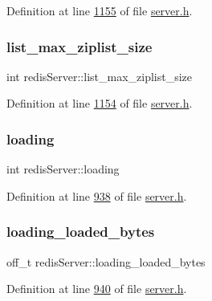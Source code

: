Definition at line \hyperlink{server_8h_source_l01155}{1155} of file \hyperlink{server_8h_source}{server.\+h}.

\mbox{\label{structredisServer_a174ed33850b6d433f8dd5b16fe8a3d3f}} 
\subsubsection{\texorpdfstring{list\+\_\+max\+\_\+ziplist\+\_\+size}{list\_max\_ziplist\_size}}
{\footnotesize\ttfamily int redis\+Server\+::list\+\_\+max\+\_\+ziplist\+\_\+size}



Definition at line \hyperlink{server_8h_source_l01154}{1154} of file \hyperlink{server_8h_source}{server.\+h}.

\mbox{\label{structredisServer_afbfd411598fdaafb7d94b580a65896d1}} 
\subsubsection{\texorpdfstring{loading}{loading}}
{\footnotesize\ttfamily int redis\+Server\+::loading}



Definition at line \hyperlink{server_8h_source_l00938}{938} of file \hyperlink{server_8h_source}{server.\+h}.

\mbox{\label{structredisServer_a44f9a4ba0d663daf84317ed2649f73e5}} 
\subsubsection{\texorpdfstring{loading\+\_\+loaded\+\_\+bytes}{loading\_loaded\_bytes}}
{\footnotesize\ttfamily off\+\_\+t redis\+Server\+::loading\+\_\+loaded\+\_\+bytes}



Definition at line \hyperlink{server_8h_source_l00940}{940} of file \hyperlink{server_8h_source}{server.\+h}.

